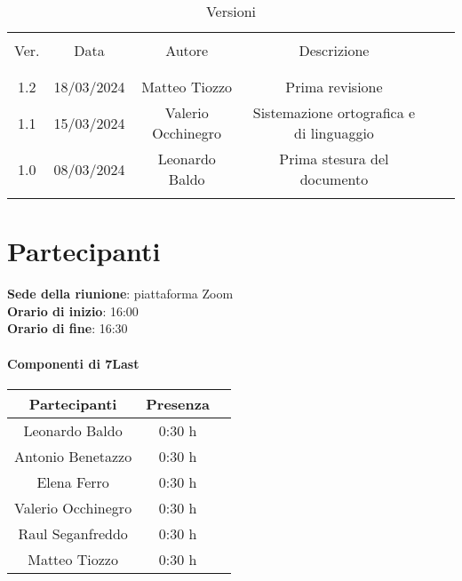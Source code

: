 \documentclass[italian,12pt]{article} %
\begin{document}


\newpage





\begin{table}[!h]
	\caption{Versioni}
	\begin{center}
		\begin{tabular}{ c c c c c c }
			\hline \\[-2ex]
			Ver. & Data & Autore & Descrizione \\
			\\[-2ex] \hline \\[-1.5ex]
			1.2 & 18/03/2024 & Matteo Tiozzo & Prima revisione \\
			1.1 & 15/03/2024 & Valerio Occhinegro& Sistemazione ortografica e di linguaggio \\
			1.0 & 08/03/2024 & Leonardo Baldo& Prima stesura del documento \\
			\\[-1.5ex] \hline
		\end{tabular}
	\end{center}
\end{table}
\newpage

\tableofcontents

\newpage

\section{Partecipanti}

\textbf{Sede della riunione}: piattaforma Zoom\\
\textbf{Orario di inizio}: 16:00\\
\textbf{Orario di fine}: 16:30\\


\paragraph{Componenti di 7Last}

\begin{flushleft}
\begin{table}[!h]
\begin{tabular}{ |c|c|c| } 
	\hline
	\textbf{Partecipanti} & \textbf{Presenza} \\
	\hline 
	Leonardo Baldo 		 & 0:30 h \\ 
	Antonio Benetazzo 	 & 0:30 h \\
	Elena Ferro 		 & 0:30 h \\
	Valerio Occhinegro 	 & 0:30 h \\
	Raul Seganfreddo 	 & 0:30 h \\
	Matteo Tiozzo 		 & 0:30 h \\ 
	\hline
\end{tabular}
\end{table}
\end{flushleft}
\end{document}
